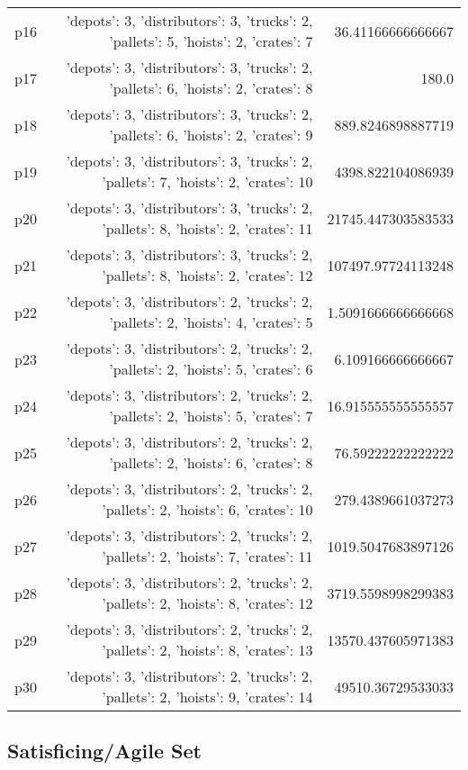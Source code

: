 \documentclass{article}
\begin{document}
\begin{center}
\begin{tabular}{r|r|r}
  p16&{'depots': 3, 'distributors': 3, 'trucks': 2, 'pallets': 5, 'hoists': 2, 'crates': 7}&36.41166666666667\\
  p17&{'depots': 3, 'distributors': 3, 'trucks': 2, 'pallets': 6, 'hoists': 2, 'crates': 8}&180.0\\
  p18&{'depots': 3, 'distributors': 3, 'trucks': 2, 'pallets': 6, 'hoists': 2, 'crates': 9}&889.8246898887719\\
  p19&{'depots': 3, 'distributors': 3, 'trucks': 2, 'pallets': 7, 'hoists': 2, 'crates': 10}&4398.822104086939\\
  p20&{'depots': 3, 'distributors': 3, 'trucks': 2, 'pallets': 8, 'hoists': 2, 'crates': 11}&21745.447303583533\\
  p21&{'depots': 3, 'distributors': 3, 'trucks': 2, 'pallets': 8, 'hoists': 2, 'crates': 12}&107497.97724113248\\
  p22&{'depots': 3, 'distributors': 2, 'trucks': 2, 'pallets': 2, 'hoists': 4, 'crates': 5}&1.5091666666666668\\
  p23&{'depots': 3, 'distributors': 2, 'trucks': 2, 'pallets': 2, 'hoists': 5, 'crates': 6}&6.109166666666667\\
  p24&{'depots': 3, 'distributors': 2, 'trucks': 2, 'pallets': 2, 'hoists': 5, 'crates': 7}&16.915555555555557\\
  p25&{'depots': 3, 'distributors': 2, 'trucks': 2, 'pallets': 2, 'hoists': 6, 'crates': 8}&76.59222222222222\\
  p26&{'depots': 3, 'distributors': 2, 'trucks': 2, 'pallets': 2, 'hoists': 6, 'crates': 10}&279.4389661037273\\
  p27&{'depots': 3, 'distributors': 2, 'trucks': 2, 'pallets': 2, 'hoists': 7, 'crates': 11}&1019.5047683897126\\
  p28&{'depots': 3, 'distributors': 2, 'trucks': 2, 'pallets': 2, 'hoists': 8, 'crates': 12}&3719.5598998299383\\
  p29&{'depots': 3, 'distributors': 2, 'trucks': 2, 'pallets': 2, 'hoists': 8, 'crates': 13}&13570.437605971383\\
  p30&{'depots': 3, 'distributors': 2, 'trucks': 2, 'pallets': 2, 'hoists': 9, 'crates': 14}&49510.36729533033
                            \end{tabular}
                            \end{center}
                    

                                \subsection*{Satisficing/Agile Set}
                                
\end{document}
